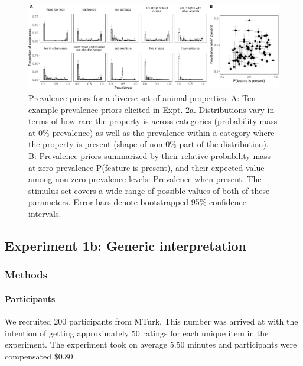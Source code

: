 \documentclass[floatsintext,doc]{apa6}
\let\oldparagraph\paragraph
\renewcommand{\paragraph}[1]{\oldparagraph{#1}\mbox{}}
\begin{document}
\begin{figure}
\centering
\includegraphics{genint_files/figure-latex/genInt-prevPrior-1.pdf}
\caption{\label{fig:genInt-prevPrior}Prevalence priors for a diverse set of animal properties. A: Ten example prevalence priors elicited in Expt. 2a. Distributions vary in terms of how rare the property is across categories (probability mass at 0\% prevalence) as well as the prevalence within a category where the property is present (shape of non-0\% part of the distribution). B: Prevalence priors summarized by their relative probability mass at zero-prevalence P(feature is present), and their expected value among non-zero prevalence levels: Prevalence when present. The stimulus set covers a wide range of possible values of both of these parameters. Error bars denote bootstrapped 95\% confidence intervals.}
\end{figure}

\hypertarget{experiment-1b-generic-interpretation}{%
\subsection{Experiment 1b: Generic interpretation}\label{experiment-1b-generic-interpretation}}

\hypertarget{methods-1}{%
\subsubsection{Methods}\label{methods-1}}

\hypertarget{participants-2}{%
\paragraph{Participants}\label{participants-2}}
%
We recruited 200 participants from MTurk.
This number was arrived at with the intention of getting approximately 50 ratings for each unique item in the experiment.
The experiment took on average 5.50 minutes and participants were compensated \$0.80.
\end{document}
